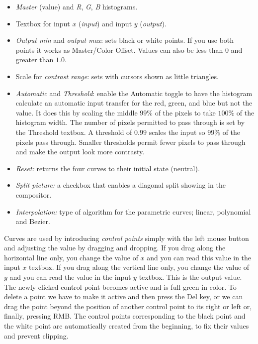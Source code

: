 \begin{itemize}
    \item \textit{Master} (value) and \textit{R}, \textit{G}, \textit{B} histograms.
    \item Textbox for input $x$ (\textit{input}) and input $y$ (\textit{output}).
    \item \textit{Output min} and \textit{output max}: sets black or white points. If you use both points it works as Master/Color
    Offset. Values can also be less than $0$ and greater than $1.0$.
    \item Scale for \textit{contrast range}: sets with cursors shown as little triangles.
    \item \textit{Automatic} and \textit{Threshold}: enable the Automatic toggle to have the histogram calculate an automatic input transfer for the red, green, and blue but not the value. It does this by scaling the middle $99\%$ of the pixels to take $100\%$ of the histogram width. The number of pixels permitted to pass through is set by the Threshold textbox. A threshold of $0.99$ scales the input so $99\%$ of the pixels pass through. Smaller thresholds permit fewer pixels to pass through and make the output look more contrasty.
    \item \textit{Reset:} returns the four curves to their initial state (neutral).
    \item \textit{Split picture:} a checkbox that enables a diagonal split showing in the compositor.
    \item \textit{Interpolation:} type of algorithm for the parametric curves; linear, polynomial and Bezier.
\end{itemize}

Curves are used by introducing \textit{control points} simply with
the left mouse button and adjusting the value by dragging and
dropping. If you drag along the horizontal line only, you change the
value of $x$ and you can read this value in the input $x$
textbox. If you drag along the vertical line only, you change the
value of $y$ and you can read the value in the input $y$
textbox. This is the output value. The newly clicked control point
becomes active and is full green in color. To delete a point we have
to make it active and then press the Del key, or we can drag the
point beyond the position of another control point to its right or
left or, finally, pressing RMB\@. The control points corresponding to
the black point and the white point are automatically created from
the beginning, to fix their values and prevent clipping.

